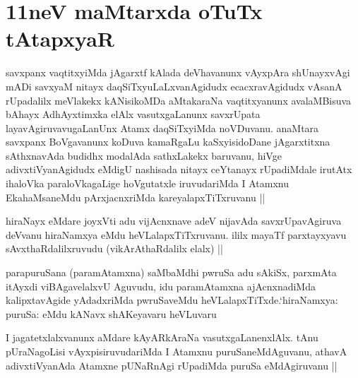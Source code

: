 
\section*{11neV maMtarxda oTuTx tAtapxyaR}

\begin{artha}
savxpanx vaqtitxyiMda jAgarxtf kAlada deVhavanunx vAyxpAra shUnayxvAgi mADi savxyaM nitayx daqSiTxyuLaLxvanAgidudx ecacxravAgidudx vAsanA rUpadalilx meVlakekx kANisikoMDa aMtakaraNa vaqtitxyanunx avalaMBisuva bAhayx AdhAyxtimxka elAlx vasutxgaLanunx savxrUpata layavAgiruvavugaLanUnx Atamx daqSiTxyiMda noVDuvanu. anaMtara savxpanx BoVgavanunx koDuva kamaRgaLu kaSxyisidoDane jAgarxtitxna sAthxnavAda budidhx modalAda sathxLakekx baruvanu, hiVge adivxtiVyanAgidudx eMdigU nashisada nitayx ceYtanayx rUpadiMdale irutAtx ihaloVka paraloVkagaLige hoVgutatxle iruvudariMda I Atamxnu EkahaMsaneMdu pArxjacnxriMda kareyalapxTiTxruvanu ||
\end{artha}


\begin{artha}
hiraNayx eMdare joyxVti adu vijAcnxnave adeV nijavAda savxrUpavAgiruva deVvanu hiraNamxya eMdu heVLalapxTiTxruvanu. ililx mayaTf parxtayxyavu sAvxthaRdalilxruvudu (vikArAthaRdalilx elalx) ||
\end{artha}


\begin{artha}
parapuruSana (paramAtamxna) saMbaMdhi pwruSa adu sAkiSx, parxmAta itAyxdi viBAgavelalxvU Aguvudu, idu paramAtamxna ajAcnxnadiMda kalipxtavAgide yAdadxriMda pwruSaveMdu heVLalapxTiTxde.`hiraNamxya: puruSa: eMdu kANavx shAKeyavaru heVLuvaru
\end{artha}


\begin{artha}
I jagatetxlalxvanunx aMdare kAyARkAraNa vasutxgaLanenxlAlx. tAnu pUraNagoLisi vAyxpisiruvudariMda I Atamxnu puruSaneMdAguvanu, athavA adivxtiVyanAda Atamxne pUNaRnAgi rUpadiMda puruSa eMdAgiruvanu ||
\end{artha}


